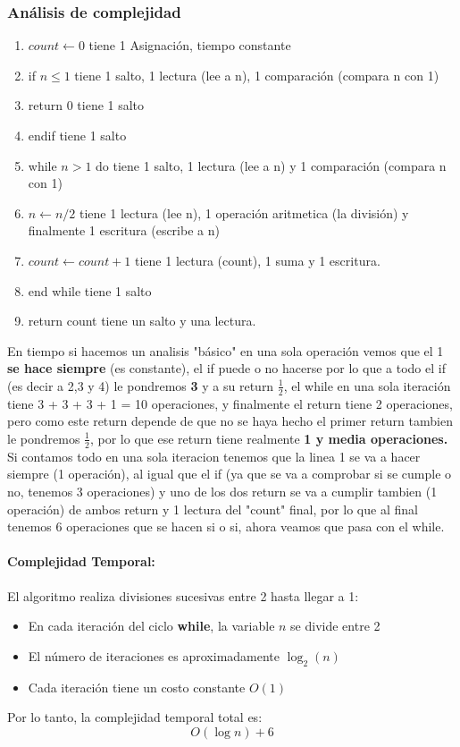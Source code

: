 \subsubsection*{Análisis de complejidad}
\begin{enumerate}
    \item $count \leftarrow 0$ tiene 1 Asignación, tiempo constante
    \item if $n \leq 1$ tiene 1 salto, 1 lectura (lee a n), 1 comparación (compara n con 1)
    \item return 0 tiene 1 salto 
    \item  endif tiene 1 salto
    \item while $n > 1$ do tiene 1 salto, 1 lectura (lee a n) y 1 comparación (compara n con 1)
    \item $n \gets n/2$ tiene 1 lectura (lee n), 1 operación aritmetica (la división) y finalmente 1 escritura (escribe a n)
    \item $count \gets count + 1$ tiene 1 lectura (count), 1 suma y 1 escritura.
    \item end while tiene 1 salto
    \item return count tiene un salto y una lectura.
\end{enumerate}
En tiempo si hacemos un analisis "básico" en una sola operación vemos que el 1 \textbf{se hace siempre} (es constante), el if puede o no hacerse por lo que a todo el if (es decir a 2,3 y 4) le pondremos \textbf{3} y a su return \textbf{$\frac{1}{2}$}, el while en una sola iteración tiene 3 + 3 + 3 + 1 = 10 operaciones, y finalmente el return tiene 2 operaciones, pero como este return depende de que no se haya hecho el primer return tambien le pondremos $\frac{1}{2}$, por lo que ese return tiene realmente \textbf{1 y media operaciones.} \\
Si contamos todo en una sola iteracion tenemos que la linea 1 se va a hacer siempre (1 operación), al igual que el if (ya que se va a comprobar si se cumple o no, tenemos 3 operaciones) y uno de los dos return se va a cumplir tambien (1 operación) de ambos return y 1 lectura del "count" final, por lo que al final tenemos 6 operaciones que se hacen si o si, ahora veamos que pasa con el while.

\paragraph{Complejidad Temporal:}
El algoritmo realiza divisiones sucesivas entre 2 hasta llegar a 1:
\begin{itemize}
    \item En cada iteración del ciclo \textbf{while}, la variable $n$ se divide entre 2
    \item El número de iteraciones es aproximadamente $\log_2(n)$
    \item Cada iteración tiene un costo constante $O(1)$
\end{itemize}
Por lo tanto, la complejidad temporal total es:
\[
O(\log n) + 6
\]

